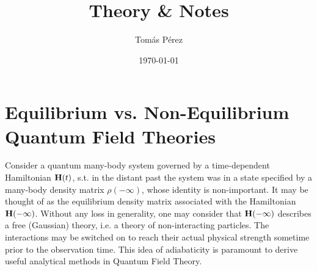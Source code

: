 \documentclass{homework}
\author{Tomás Pérez}
\date{\today}
\title{Theory \& Notes}
\begin{document}
 \maketitle

\tableofcontents

\iffalse
\section{{\textbf{Quantum Phase Transitions}}}
{1. Quantum Phase Transitions}
\clearpage

\section{{\textbf{Spin Chain models}}}
{2. Spin Chain Models}
\clearpage

\section{{\textbf{Ising and Heisenberg Models}}}
{3. Ising and Heisenberg Spin Models}
\clearpage

\section{{\textbf{Spin Wave Theory}}}
{4. Spin Wave Theory}
\clearpage

\section{{\textbf{Additional Topics}}}
{5. Additional Topics}
\clearpage

\fi

\section{Equilibrium vs. Non-Equilibrium Quantum Field Theories} 

Consider a quantum many-body system governed by a time-dependent Hamiltonian ${\bf H}(t)$, s.t. in the distant past the system was in a state specified by a many-body density matrix $\rho(-\infty)$, whose identity is non-important. 
It may be thought of as the equilibrium density matrix associated with the Hamiltonian ${\bf H}(-\infty)$. Without any loss in generality, one may consider that ${\bf H}(-\infty)$ describes a free (Gaussian) theory, i.e. a theory of non-interacting particles. 
The interactions may be  switched on to reach their actual physical strength sometime prior to the observation time. 
This idea of adiabaticity is paramount to derive useful analytical methods in Quantum Field Theory. \bigbreak
\end{document}
